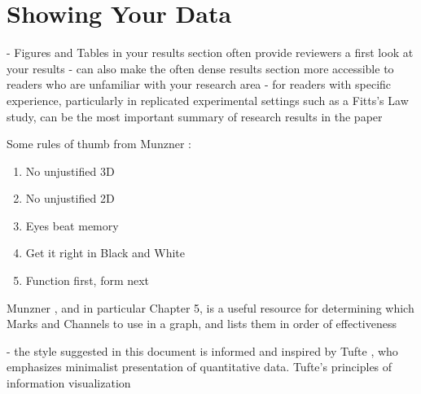 \newpage



\section{Showing Your Data}


- Figures and Tables in your results section often provide reviewers a first look at your results
- can also make the often dense results section more accessible to readers who are unfamiliar with your research area
- for readers with specific experience, particularly in replicated experimental settings such as a Fitts's Law study, can be the most important summary of research results in the paper 


Some rules of thumb from Munzner \citep{munznervisualization}:
\begin{enumerate}
	\item No unjustified 3D
	\item No unjustified 2D
	\item Eyes beat memory
	\item Get it right in Black and White
	\item Function first, form next
\end{enumerate}


Munzner \citep{munznervisualization}, and in particular Chapter 5, is a useful resource for determining which Marks and Channels to use in a graph, and lists them in order of effectiveness

- the style suggested in this document is informed and inspired by Tufte \citep{tufte1983visual}, who emphasizes minimalist presentation of quantitative data. Tufte's principles of information visualization 

 
 


 
 














